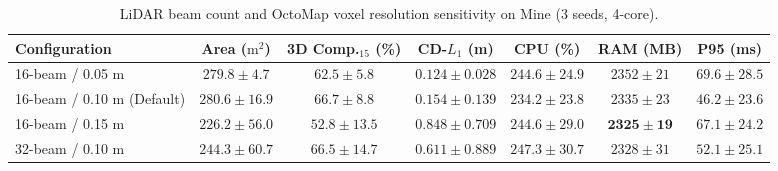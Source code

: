 \begin{table}[t]
\centering
\caption{LiDAR beam count and OctoMap voxel resolution sensitivity on Mine (3 seeds, 4-core).}
\label{tab:sensitivity}
\footnotesize
\begin{tabular}{lcccccc}
\toprule
Configuration & Area ($\text{m}^2$) & 3D Comp.$_{15}$ (\%) & CD-$L_1$ (m) & CPU (\%) & RAM (MB) & P95 (ms) \\
\midrule
16-beam / 0.05 m & $279.8 \pm 4.7$ & $62.5 \pm 5.8$ & $\mathbf{0.124 \pm 0.028}$ & $244.6 \pm 24.9$ & $2352 \pm 21$ & $69.6 \pm 28.5$ \\
16-beam / 0.10 m (Default) & $280.6 \pm 16.9$ & $\mathbf{66.7 \pm 8.8}$ & $0.154 \pm 0.139$ & $\mathbf{234.2 \pm 23.8}$ & $2335 \pm 23$ & $\mathbf{46.2 \pm 23.6}$ \\
16-beam / 0.15 m & $226.2 \pm 56.0$ & $52.8 \pm 13.5$ & $0.848 \pm 0.709$ & $244.6 \pm 29.0$ & $\mathbf{2325 \pm 19}$ & $67.1 \pm 24.2$ \\
32-beam / 0.10 m & $244.3 \pm 60.7$ & $66.5 \pm 14.7$ & $0.611 \pm 0.889$ & $247.3 \pm 30.7$ & $2328 \pm 31$ & $52.1 \pm 25.1$ \\
\bottomrule
\end{tabular}
\end{table}
